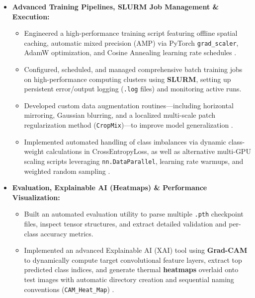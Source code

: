 \begin{itemize}
\begin{itemize}
\begin{itemize}
            \item Implemented robust checkpoint-aware file counters and duplicate-prevention mechanisms (\texttt{get\_next\_counter}) to safely merge local classes and external image archives into a unified, clean dataset structure.
        \end{itemize}
        \item \textbf{Advanced Training Pipelines, SLURM Job Management \& Execution:}
        \begin{itemize}
            \item Engineered a high-performance training script featuring offline spatial caching, automatic mixed precision (AMP) via PyTorch \texttt{grad\_scaler}, AdamW optimization, and Cosine Annealing learning rate schedules \cite{paszke2019pytorch}.
            \item Configured, scheduled, and managed comprehensive batch training jobs on high-performance computing clusters using \textbf{SLURM}, setting up persistent error/output logging (\texttt{.log} files) and monitoring active runs.
            \item Developed custom data augmentation routines—including horizontal mirroring, Gaussian blurring, and a localized multi-scale patch regularization method (\texttt{CropMix})—to improve model generalization \cite{yun2019cutmix}.
            \item Implemented automated handling of class imbalances via dynamic class-weight calculations in CrossEntropyLoss, as well as alternative multi-GPU scaling scripts leveraging \texttt{nn.DataParallel}, learning rate warmups, and weighted random sampling \cite{paszke2019pytorch}.
        \end{itemize}
        \item \textbf{Evaluation, Explainable AI (Heatmaps) \& Performance Visualization:}
        \begin{itemize}
            \item Built an automated evaluation utility to parse multiple \texttt{.pth} checkpoint files, inspect tensor structures, and extract detailed validation and per-class accuracy metrics.
            \item Implemented an advanced Explainable AI (XAI) tool using \textbf{Grad-CAM} to dynamically compute target convolutional feature layers, extract top predicted class indices, and generate thermal \textbf{heatmaps} overlaid onto test images with automatic directory creation and sequential naming conventions (\texttt{CAM\_Heat\_Map}) \cite{selvaraju2017grad}.

\end{itemize}
\end{itemize}
\end{itemize}
